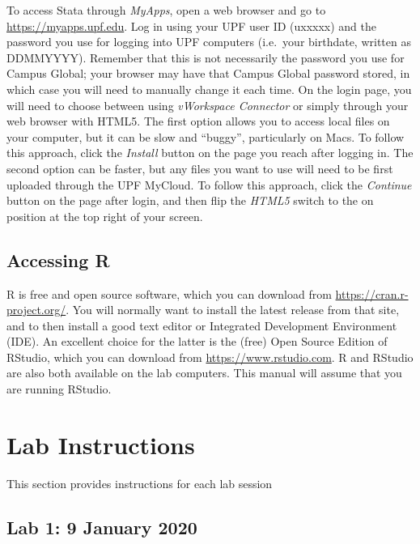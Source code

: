 \documentclass[]{book}
\begin{document}
To access Stata through \emph{MyApps}, open a web browser and go to \url{https://myapps.upf.edu}. Log in using your UPF user ID (uxxxxx) and the password you use for logging into UPF computers (i.e.~your birthdate, written as DDMMYYYY). Remember that this is not necessarily the password you use for Campus Global; your browser may have that Campus Global password stored, in which case you will need to manually change it each time. On the login page, you will need to choose between using \emph{vWorkspace Connector} or simply through your web browser with HTML5. The first option allows you to access local files on your computer, but it can be slow and ``buggy'', particularly on Macs. To follow this approach, click the \emph{Install} button on the page you reach after logging in. The second option can be faster, but any files you want to use will need to be first uploaded through the UPF MyCloud. To follow this approach, click the \emph{Continue} button on the page after login, and then flip the \emph{HTML5} switch to the on position at the top right of your screen.

\hypertarget{accessing-r}{%
\section*{Accessing R}\label{accessing-r}}

R is free and open source software, which you can download from \url{https://cran.r-project.org/}. You will normally want to install the latest release from that site, and to then install a good text editor or Integrated Development Environment (IDE). An excellent choice for the latter is the (free) Open Source Edition of RStudio, which you can download from \url{https://www.rstudio.com}. R and RStudio are also both available on the lab computers. This manual will assume that you are running RStudio.

\hypertarget{lab-instructions}{%
\chapter*{Lab Instructions}\label{lab-instructions}}

This section provides instructions for each lab session

\hypertarget{lab-1-9-january-2020}{%
\section*{Lab 1: 9 January 2020}\label{lab-1-9-january-2020}}
\end{document}
